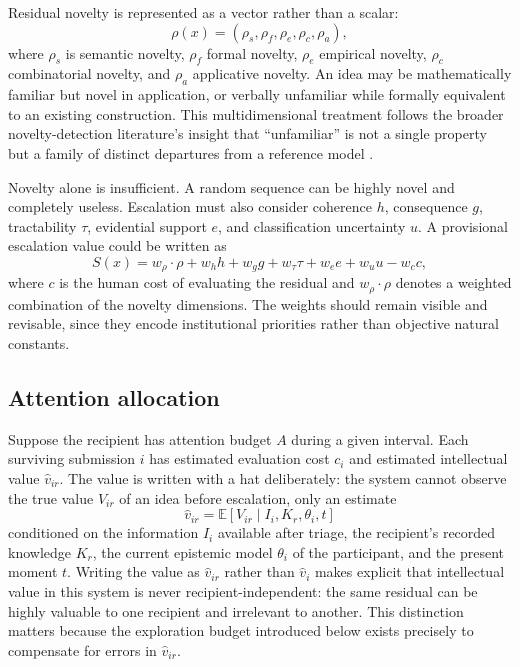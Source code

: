 \documentclass[11pt]{article}
\begin{document}
Residual novelty is represented as a vector rather than a scalar:
\[
\rho(x) = (\rho_s, \rho_f, \rho_e, \rho_c, \rho_a),
\]
where $\rho_s$ is semantic novelty, $\rho_f$ formal novelty, $\rho_e$ empirical novelty, $\rho_c$ combinatorial novelty, and $\rho_a$ applicative novelty. An idea may be mathematically familiar but novel in application, or verbally unfamiliar while formally equivalent to an existing construction. This multidimensional treatment follows the broader novelty-detection literature's insight that ``unfamiliar'' is not a single property but a family of distinct departures from a reference model \cite{markou2003a,markou2003b}.

Novelty alone is insufficient. A random sequence can be highly novel and completely useless. Escalation must also consider coherence $h$, consequence $g$, tractability $\tau$, evidential support $e$, and classification uncertainty $u$. A provisional escalation value could be written as
\[
S(x) = w_\rho \cdot \rho + w_h h + w_g g + w_\tau \tau + w_e e + w_u u - w_c c,
\]
where $c$ is the human cost of evaluating the residual and $w_\rho \cdot \rho$ denotes a weighted combination of the novelty dimensions. The weights should remain visible and revisable, since they encode institutional priorities rather than objective natural constants.

\subsection{Attention allocation}

Suppose the recipient has attention budget $A$ during a given interval. Each surviving submission $i$ has estimated evaluation cost $c_i$ and estimated intellectual value $\widehat{v}_{ir}$. The value is written with a hat deliberately: the system cannot observe the true value $V_{ir}$ of an idea before escalation, only an estimate
\[
\widehat{v}_{ir} = \mathbb{E}\left[V_{ir} \mid I_i, K_r, \theta_i, t\right]
\]
conditioned on the information $I_i$ available after triage, the recipient's recorded knowledge $K_r$, the current epistemic model $\theta_i$ of the participant, and the present moment $t$. Writing the value as $\widehat{v}_{ir}$ rather than $\widehat{v}_i$ makes explicit that intellectual value in this system is never recipient-independent: the same residual can be highly valuable to one recipient and irrelevant to another. This distinction matters because the exploration budget introduced below exists precisely to compensate for errors in $\widehat{v}_{ir}$.
\end{document}

